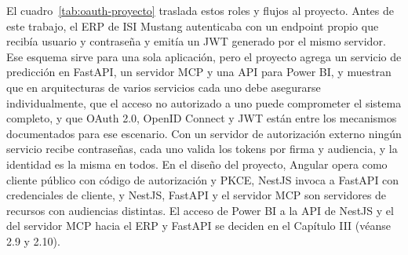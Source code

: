 El cuadro~\ref{tab:oauth-proyecto} traslada estos roles y flujos al proyecto. Antes de este trabajo, el ERP de ISI Mustang autenticaba con un endpoint propio que recibía usuario y contraseña y emitía un JWT generado por el mismo servidor. Ese esquema sirve para una sola aplicación, pero el proyecto agrega un servicio de predicción en FastAPI, un servidor MCP y una API para Power BI, y \textcite{Almeida2022} muestran que en arquitecturas de varios servicios cada uno debe asegurarse individualmente, que el acceso no autorizado a uno puede comprometer el sistema completo, y que OAuth 2.0, OpenID Connect y JWT están entre los mecanismos documentados para ese escenario. Con un servidor de autorización externo ningún servicio recibe contraseñas, cada uno valida los tokens por firma y audiencia, y la identidad es la misma en todos. En el diseño del proyecto, Angular opera como cliente público con código de autorización y PKCE, NestJS invoca a FastAPI con credenciales de cliente, y NestJS, FastAPI y el servidor MCP son servidores de recursos con audiencias distintas. El acceso de Power BI a la API de NestJS y el del servidor MCP hacia el ERP y FastAPI se deciden en el Capítulo III (véanse 2.9 y 2.10).

